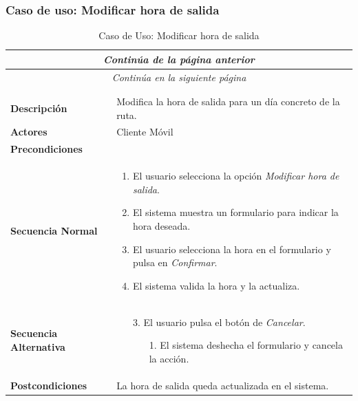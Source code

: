 \newpage
\subsubsection*{Caso de uso: Modificar hora de salida }
\begin{longtable}{| p{4cm} | p{10cm} |}
\endfirsthead
\multicolumn{2}{c}{\textit{Continúa de la página anterior}}\\[12pt]
\hline
\endhead
\hline
\multicolumn{2}{c}{\textit{Continúa en la siguiente página}} \\
\endfoot
\hline
\caption{Caso de Uso: Modificar hora de salida}\label{fig:1}\\
\endlastfoot


\hline
\multicolumn{2}{|c|}{\textbf{CU$<$15$>$ - Modificar Hora de Salida}} \\

\hline
\textbf{Descripción} &
Modifica la hora de salida para un día concreto de la ruta.\\

\hline
\textbf{Actores} &
Cliente Móvil\\

\hline
\textbf{Precondiciones} &
\\

\hline
\textbf{Secuencia Normal} &\mbox{}\par\vspace{-\baselineskip}
\begin{enumerate}[leftmargin=0.7cm, topsep=0.1cm]
\item El usuario selecciona la opción \textit{Modificar hora de salida}.
\item El sistema muestra un formulario para indicar la hora deseada.
\item El usuario selecciona la hora en el formulario y pulsa en \textit{Confirmar}.
\item El sistema valida la hora y la actualiza.
\end{enumerate}


\\
\hline
\textbf{Secuencia Alternativa} &\mbox{}\par\vspace{-\baselineskip}
\begin{enumerate}[leftmargin=0.9cm, topsep=0.1cm]
\item[3.] El usuario pulsa el botón de \textit{Cancelar}.
	\begin{itemize}
	\item[1.] El sistema deshecha el formulario y cancela la acción.
	\end{itemize}
\end{enumerate}
\\

\hline
\textbf{Postcondiciones} & 
La hora de salida queda actualizada en el sistema.\\
\hline
\end{longtable}



